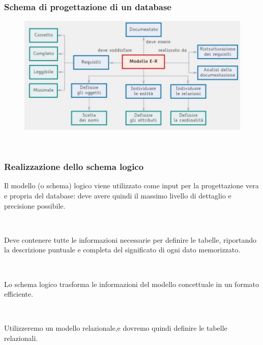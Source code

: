 \documentclass[]{beamer}
\begin{document}
\begin{frame}
\frametitle{Schema di progettazione di un database}
\begin{figure}
  \includegraphics[width=\columnwidth]{img/schemaprogettodb.png}

  ~

  \href{https://drive.google.com/file/d/1CgjeBq9g0px8xHsf9-F2KneF8EB-yGiY/view?usp=share_link}{}
\end{figure}
\end{frame}

\begin{frame}
\frametitle{Realizzazione dello schema logico}
Il modello (o schema) logico viene utilizzato come input per la progettazione vera e propria del database: deve avere quindi il massimo livello di dettaglio e precisione possibile.\pause

~

Deve contenere tutte le informazioni necessarie per definire le tabelle, riportando la descrizione puntuale e completa del significato di ogni dato memorizzato.\pause

~

\alert<3>{Lo schema logico trasforma le informazioni del modello concettuale in un formato efficiente.}\pause

~

Utilizzeremo un modello relazionale,e dovremo quindi definire le \alert<4>{tabelle relazionali}.
\end{frame}
\end{document}

